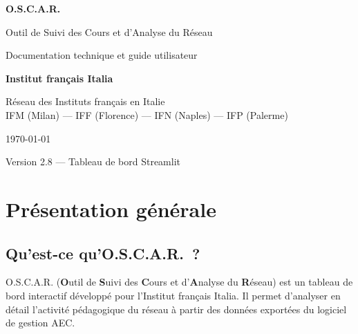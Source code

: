 \documentclass[12pt,a4paper,twoside]{article}
\begin{document}
\begin{titlepage}
\begin{center}
\vspace*{2cm}

{\Huge\bfseries\color{ifiBlue} O.S.C.A.R.}

\vspace{0.5cm}
{\Large\color{ifiGray} Outil de Suivi des Cours et d'Analyse du R\'{e}seau}

\vspace{1.5cm}
{\large Documentation technique et guide utilisateur}

\vspace{2cm}


\vspace{1cm}
{\large\bfseries Institut fran\c{c}ais Italia}

\vspace{0.5cm}
{\color{ifiGray} R\'{e}seau des Instituts fran\c{c}ais en Italie\\
IFM (Milan) --- IFF (Florence) --- IFN (Naples) --- IFP (Palerme)}

\vspace{2cm}
{\color{ifiGray}\today}

\vspace{1cm}
{\small Version 2.8 --- Tableau de bord Streamlit}
\end{center}
\end{titlepage}

\tableofcontents
\newpage

\section{Pr\'{e}sentation g\'{e}n\'{e}rale}

\subsection{Qu'est-ce qu'O.S.C.A.R.~?}

O.S.C.A.R. (\textbf{O}util de \textbf{S}uivi des \textbf{C}ours et d'\textbf{A}nalyse du \textbf{R}\'{e}seau) est un tableau de bord interactif d\'{e}velopp\'{e} pour l'Institut fran\c{c}ais Italia. Il permet d'analyser en d\'{e}tail l'activit\'{e} p\'{e}dagogique du r\'{e}seau \`{a} partir des donn\'{e}es export\'{e}es du logiciel de gestion AEC.
\end{document}
